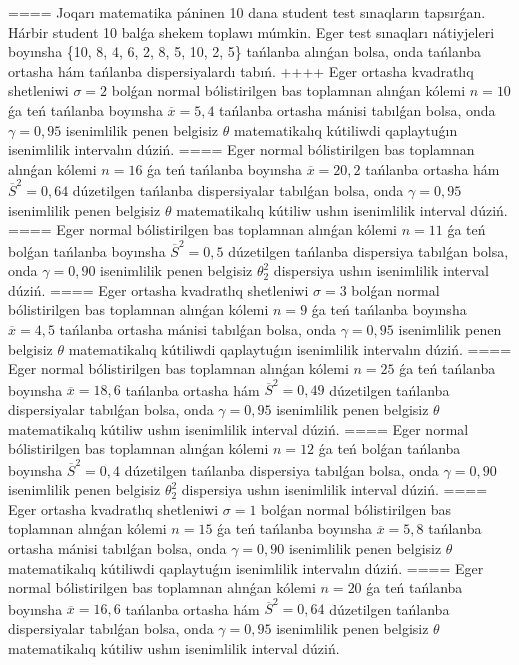 ====
Joqarı matematika páninen 10 dana student test sınaqların tapsırǵan. Hárbir student 10 balǵa shekem toplawı múmkin. Eger test sınaqları nátiyjeleri boyınsha \{10, 8, 4, 6, 2, 8, 5, 10, 2, 5\} tańlanba alınǵan bolsa, onda tańlanba ortasha hám tańlanba dispersiyalardı tabıń.
++++
Eger ortasha kvadratlıq shetleniwi \(\sigma = 2\) bolǵan normal bólistirilgen bas toplamnan alınǵan kólemi \(n = 10\) ǵa teń tańlanba boyınsha \(\overline{x} = 5,4\) tańlanba ortasha mánisi tabılǵan bolsa, onda \(\gamma = 0,95\) isenimlilik penen belgisiz \(\theta\) matematikalıq kútiliwdi qaplaytuǵın isenimlilik intervalın dúziń.
====
Eger normal bólistirilgen bas toplamnan alınǵan kólemi \(n = 16\) ǵa teń tańlanba boyınsha \(\overline{x} = 20,2\) tańlanba ortasha hám \({\overline{S}}^{2} = 0,64\) dúzetilgen tańlanba dispersiyalar tabılǵan bolsa, onda \(\gamma = 0,95\) isenimlilik penen belgisiz \(\theta\) matematikalıq kútiliw ushın isenimlilik interval dúziń.
====
Eger normal bólistirilgen bas toplamnan alınǵan kólemi \(n = 11\) ǵa teń bolǵan tańlanba boyınsha \({\overline{S}}^{2} = 0,5\) dúzetilgen tańlanba dispersiya tabılǵan bolsa, onda \(\gamma = 0,90\) isenimlilik penen belgisiz \(\theta_{2}^{2}\) dispersiya ushın isenimlilik interval dúziń.
====
Eger ortasha kvadratlıq shetleniwi \(\sigma = 3\) bolǵan normal bólistirilgen bas toplamnan alınǵan kólemi \(n = 9\) ǵa teń tańlanba boyınsha \(\overline{x} = 4,5\) tańlanba ortasha mánisi tabılǵan bolsa, onda \(\gamma = 0,95\) isenimlilik penen belgisiz \(\theta\) matematikalıq kútiliwdi qaplaytuǵın isenimlilik intervalın dúziń.
====
Eger normal bólistirilgen bas toplamnan alınǵan kólemi \(n = 25\) ǵa teń tańlanba boyınsha \(\overline{x} = 18,6\) tańlanba ortasha hám \({\overline{S}}^{2} = 0,49\) dúzetilgen tańlanba dispersiyalar tabılǵan bolsa, onda \(\gamma = 0,95\) isenimlilik penen belgisiz \(\theta\) matematikalıq kútiliw ushın isenimlilik interval dúziń.
====
Eger normal bólistirilgen bas toplamnan alınǵan kólemi \(n = 12\) ǵa teń bolǵan tańlanba boyınsha \({\overline{S}}^{2} = 0,4\) dúzetilgen tańlanba dispersiya tabılǵan bolsa, onda \(\gamma = 0,90\) isenimlilik penen belgisiz \(\theta_{2}^{2}\) dispersiya ushın isenimlilik interval dúziń.
====
Eger ortasha kvadratlıq shetleniwi \(\sigma = 1\) bolǵan normal bólistirilgen bas toplamnan alınǵan kólemi \(n = 15\) ǵa teń tańlanba boyınsha \(\overline{x} = 5,8\) tańlanba ortasha mánisi tabılǵan bolsa, onda \(\gamma = 0,90\) isenimlilik penen belgisiz \(\theta\) matematikalıq kútiliwdi qaplaytuǵın isenimlilik intervalın dúziń.
====
Eger normal bólistirilgen bas toplamnan alınǵan kólemi \(n = 20\) ǵa teń tańlanba boyınsha \(\overline{x} = 16,6\) tańlanba ortasha hám \({\overline{S}}^{2} = 0,64\) dúzetilgen tańlanba dispersiyalar tabılǵan bolsa, onda \(\gamma = 0,95\) isenimlilik penen belgisiz \(\theta\) matematikalıq kútiliw ushın isenimlilik interval dúziń.

